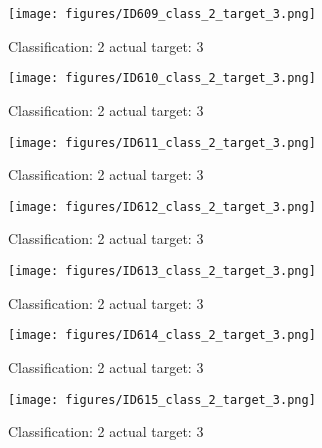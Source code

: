 \begin{figure}[h!]
\begin{center}
\texttt{[image: figures/ID609\_class\_2\_target\_3.png]}
\end{center}
\caption{ Classification: 2 actual target: 3}
\label{fig:ID609_class_2_target_3}
\end{figure}
\begin{figure}[h!]
\begin{center}
\texttt{[image: figures/ID610\_class\_2\_target\_3.png]}
\end{center}
\caption{ Classification: 2 actual target: 3}
\label{fig:ID610_class_2_target_3}
\end{figure}
\begin{figure}[h!]
\begin{center}
\texttt{[image: figures/ID611\_class\_2\_target\_3.png]}
\end{center}
\caption{ Classification: 2 actual target: 3}
\label{fig:ID611_class_2_target_3}
\end{figure}
\begin{figure}[h!]
\begin{center}
\texttt{[image: figures/ID612\_class\_2\_target\_3.png]}
\end{center}
\caption{ Classification: 2 actual target: 3}
\label{fig:ID612_class_2_target_3}
\end{figure}
\begin{figure}[h!]
\begin{center}
\texttt{[image: figures/ID613\_class\_2\_target\_3.png]}
\end{center}
\caption{ Classification: 2 actual target: 3}
\label{fig:ID613_class_2_target_3}
\end{figure}
\begin{figure}[h!]
\begin{center}
\texttt{[image: figures/ID614\_class\_2\_target\_3.png]}
\end{center}
\caption{ Classification: 2 actual target: 3}
\label{fig:ID614_class_2_target_3}
\end{figure}
\begin{figure}[h!]
\begin{center}
\texttt{[image: figures/ID615\_class\_2\_target\_3.png]}
\end{center}
\caption{ Classification: 2 actual target: 3}
\label{fig:ID615_class_2_target_3}
\end{figure}
